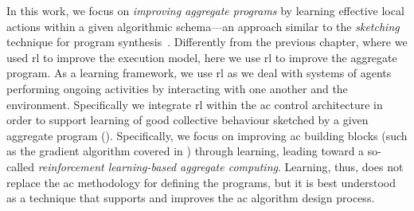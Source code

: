 In this work, we focus on \emph{improving aggregate programs}
 by learning effective local actions
 within a given algorithmic schema---an approach similar to the \emph{sketching} technique for program synthesis~\cite{solar2008program-synthesis-sketching}.
Differently from the previous chapter, 
 where we used \ac{rl} to improve the execution model, 
 here we use \ac{rl} to improve the aggregate program.
As a learning framework,
 we use \ac{rl} as 
 we deal with systems of agents 
 performing ongoing activities 
 by interacting with one another and the environment. 
%
Specifically we integrate \ac{rl} within the \ac{ac} control architecture in order to support learning of good collective behaviour sketched by a given aggregate program ().
%
Specifically, 
 we focus on improving \ac{ac} building blocks (such as the gradient algorithm covered in ) through learning, 
 leading toward a so-called \emph{reinforcement learning-based aggregate computing}. 
%
Learning, thus, does not replace the \ac{ac} methodology for defining the programs, 
 but it is best understood as a technique that supports and improves the \ac{ac} algorithm design process. 
